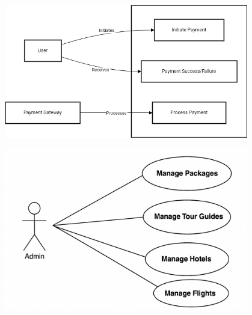 \vspace{0.5cm}
\begin{center}
\includegraphics[width=0.8\textwidth]{./figures/Use Case Diagrams/3_usecase.png} %
\end{center}
\vspace{0.5cm}

\vspace{0.5cm}
\begin{center}
\includegraphics[width=0.8\textwidth]{./figures/Use Case Diagrams/4_crud_usecase.png} %
\end{center}
\vspace{0.5cm}
